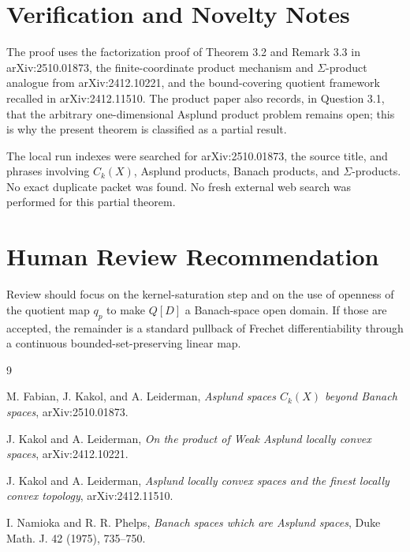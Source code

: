 \documentclass[11pt]{article}
\begin{document}
\section*{Verification and Novelty Notes}

The proof uses the factorization proof of Theorem 3.2 and Remark 3.3 in
arXiv:2510.01873, the finite-coordinate product mechanism and
$\Sigma$-product analogue from arXiv:2412.10221, and the bound-covering
quotient framework recalled in arXiv:2412.11510. The product paper also
records, in Question 3.1, that the arbitrary one-dimensional Asplund product
problem remains open; this is why the present theorem is classified as a
partial result.

The local run indexes were searched for arXiv:2510.01873, the source title,
and phrases involving $C_k(X)$, Asplund products, Banach products, and
$\Sigma$-products. No exact duplicate packet was found. No fresh external web
search was performed for this partial theorem.

\section*{Human Review Recommendation}

Review should focus on the kernel-saturation step and on the use of openness
of the quotient map $q_p$ to make $Q[D]$ a Banach-space open domain. If those
are accepted, the remainder is a standard pullback of Frechet differentiability
through a continuous bounded-set-preserving linear map.

\begin{thebibliography}{9}

M. Fabian, J. Kakol, and A. Leiderman,
\emph{Asplund spaces $C_k(X)$ beyond Banach spaces},
arXiv:2510.01873.

J. Kakol and A. Leiderman,
\emph{On the product of Weak Asplund locally convex spaces},
arXiv:2412.10221.

J. Kakol and A. Leiderman,
\emph{Asplund locally convex spaces and the finest locally convex topology},
arXiv:2412.11510.

I. Namioka and R. R. Phelps,
\emph{Banach spaces which are Asplund spaces},
Duke Math. J. 42 (1975), 735--750.

\end{thebibliography}
\end{document}
